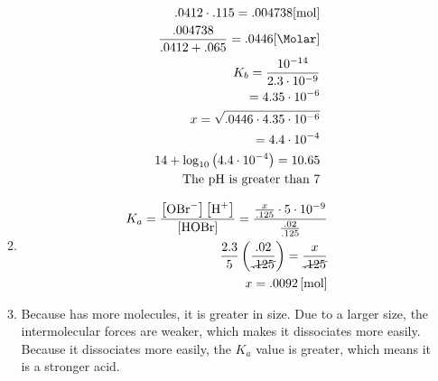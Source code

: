 \documentclass[12pt]{article}
\begin{document}
\begin{enumerate}
\begin{enumerate}
\begin{enumerate}
            \begin{equation}
              \begin{split}
                .0412\cdot.115=.004738[\si{\mole}]\\
                \frac{.004738}{.0412+.065}=.0446[\si{\Molar}]\\
                K_b=\frac{10^{-14}}{2.3\cdot10^{-9}}\\
                =4.35\cdot10^{-6}\\
                x=\sqrt{.0446\cdot4.35\cdot10^{-6}}\\
                =4.4\cdot10^{-4}\\
                14+\log_{10}\left( 4.4\cdot10^{-4} \right)=10.65\\
                \text{The \ce{pH} is greater than 7}
              \end{split}
              \label{4}
            \end{equation}

        \end{enumerate}


      \item 

        \begin{equation}
          \begin{split}
            K_a=\frac{\left[ \ce{OBr-} \right]\left[ \ce{H+} \right]}{\left[ \ce{HOBr} \right]}=\frac{\frac{x}{.125}\cdot5\cdot10^{-9}}{\frac{.02}{.125}}\\
            \frac{2.3}{5}\left( \frac{.02}{\cancel{.125}} \right)=\frac{x}{\cancel{.125}}\\
            x=.0092\left[ \si{\mole} \right]
          \end{split}
          \label{4}
        \end{equation}

      \item Because  has more molecules, it is greater in size. Due to a larger size, the intermolecular forces are weaker, which makes it dissociates more easily. Because it dissociates more easily, the $K_a$ value is greater, which means it is a stronger acid.

    \end{enumerate}

\end{enumerate}
\end{document}
